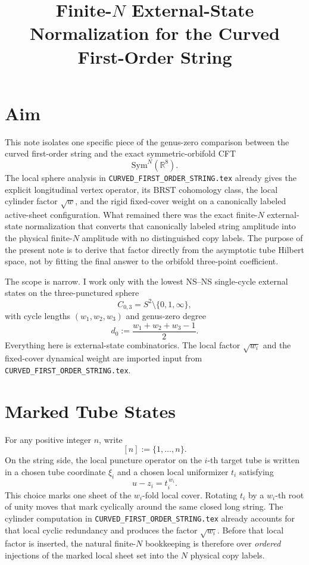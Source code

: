 \documentclass[11pt]{article}
\title{Finite-\texorpdfstring{$N$}{N} External-State Normalization for the Curved First-Order String}
\author{}
\date{}
\newcommand{\Sym}{\mathrm{Sym}}
\newcommand{\bR}{\mathbb{R}}
\begin{document}
\maketitle

\section{Aim}
This note isolates one specific piece of the genus-zero comparison between the curved first-order string and the exact symmetric-orbifold CFT
\begin{equation}\label{eq:aim-orbifold}
\Sym^N(\bR^8).
\end{equation}
The local sphere analysis in \texttt{CURVED\_FIRST\_ORDER\_STRING.tex} already gives the explicit longitudinal vertex operator, its BRST cohomology class, the local cylinder factor $\sqrt{w}$, and the rigid fixed-cover weight on a canonically labeled active-sheet configuration. What remained there was the exact finite-$N$ external-state normalization that converts that canonically labeled string amplitude into the physical finite-$N$ amplitude with no distinguished copy labels. The purpose of the present note is to derive that factor directly from the asymptotic tube Hilbert space, not by fitting the final answer to the orbifold three-point coefficient.

The scope is narrow. I work only with the lowest NS--NS single-cycle external states on the three-punctured sphere
\[
C_{0,3}=S^2\setminus\{0,1,\infty\},
\]
with cycle lengths $(w_1,w_2,w_3)$ and genus-zero degree
\begin{equation}\label{eq:degree-d0}
d_0:=\frac{w_1+w_2+w_3-1}{2}.
\end{equation}
Everything here is external-state combinatorics. The local factor $\sqrt{w_i}$ and the fixed-cover dynamical weight are imported input from \texttt{CURVED\_FIRST\_ORDER\_STRING.tex}.

\section{Marked Tube States}
For any positive integer $n$, write
\[
[n]:=\{1,\dots,n\}.
\]
On the string side, the local puncture operator on the $i$-th target tube is written in a chosen tube coordinate $\xi_i$ and a chosen local uniformizer $t_i$ satisfying
\begin{equation}\label{eq:local-uniformizer}
u-z_i=t_i^{\,w_i}.
\end{equation}
This choice marks one sheet of the $w_i$-fold local cover. Rotating $t_i$ by a $w_i$-th root of unity moves that mark cyclically around the same closed long string. The cylinder computation in \texttt{CURVED\_FIRST\_ORDER\_STRING.tex} already accounts for that local cyclic redundancy and produces the factor $\sqrt{w_i}$. Before that local factor is inserted, the natural finite-$N$ bookkeeping is therefore over \emph{ordered} injections of the marked local sheet set into the $N$ physical copy labels.
\end{document}

